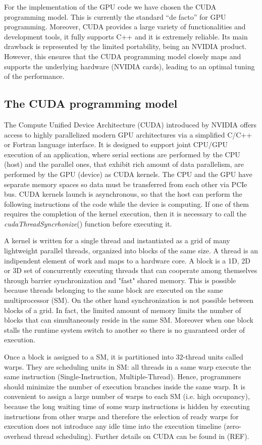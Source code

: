 \documentclass[11pt]{article}
\begin{document}
For the implementation of the GPU code we have chosen the CUDA programming
model. This is currently the standard ``de facto'' for GPU programming.
Moreover, CUDA provides a large variety of functionalities and
development tools, it fully supports C++ and it is extremely reliable. Its main drawback is
represented by the limited portability, being an NVIDIA product. However, 
this ensures that the CUDA programming model closely maps and supports the underlying 
hardware (NVIDIA cards), leading to an optimal tuning of the performance.  

\subsection{The CUDA programming model}

The Compute Unified Device Architecture (CUDA) introduced by NVIDIA offers access to highly parallelized modern GPU architectures via a simplified C/C++ or Fortran language interface. It is designed to support joint CPU/GPU execution of an application, where serial sections are performed by the CPU (host) and the parallel ones, that exhibit rich amount of data parallelism, are performed by the GPU (device) as CUDA kernels. The CPU and the GPU have separate memory spaces so data must be transferred from each other via PCIe bus. CUDA kernels launch is asynchronous, so that the host can perform the following instructions of the code while the device is computing. If one of them requires the completion of the kernel execution, then it is necessary to call the \textit{cudaThreadSyncrhonize}() function before executing it. 

A kernel is written for a single thread and instantiated as a grid of many lightweight parallel threads, organized into blocks of the same size. 
A thread is an indipendent element of work and maps to a hardware core. A block is a 1D, 2D or 3D set of concurrently executing threads that can cooperate among themselves through barrier synchronization and "fast" shared memory. This is possible because threads belonging to the same block are executed on the same multiprocessor (SM). On the other hand synchronization is not possible between blocks of a grid. In fact, the limited amount of memory limits the number of blocks that can simultaneously reside in the same SM. Moreover when one block stalls the runtime system switch to another so there is no guaranteed order of execution.

Once a block is assigned to a SM, it is partitioned into 32-thread units called warps. They are scheduling units in SM:
all threads in a same warp execute the same instruction (Single-Instruction, Multiple-Thread). Hence, programmers should minimize the number of execution branches inside the same warp. It is convenient to assign a large number of warps to each SM (i.e. high occupancy), because the long waiting time of some warp instructions is hidden by executing instructions from other warps  and therefore the selection of ready warps for execution does not introduce any idle time into the execution timeline (zero-overhead thread scheduling). Further details on CUDA can be found in (REF).
\end{document}
